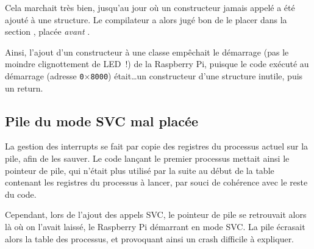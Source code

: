 \documentclass[11pt,a4paper]{article}
\newcommand{\hex}[1]{\texttt{0$\times$#1}}
\begin{document}
Cela marchait très bien, jusqu'au jour où un constructeur jamais appelé a été
ajouté à une structure. Le compilateur a alors jugé bon de le placer dans
la section , placée \emph{avant} .

Ainsi, l'ajout d'un constructeur à une classe empêchait le démarrage
(pas le moindre clignottement de LED~!) de la Raspberry Pi, puisque le code
exécuté au démarrage (adresse \hex{8000}) était\ldots un constructeur d'une
structure inutile, puis un return.

\subsection*{Pile du mode SVC mal placée}
La gestion des interrupts se fait par copie des registres du processus
actuel sur la pile, afin de les sauver. Le code lançant le premier
processus mettait ainsi le pointeur de pile, qui n'était plus utilisé
par la suite au début de la table contenant les registres du processus
à lancer, par souci de cohérence avec le reste du code.

Cependant, lors de l'ajout des appels SVC, le pointeur de pile se
retrouvait alors là où on l'avait laissé, le Raspberry Pi démarrant en
mode SVC\@. La pile écrasait alors la table des processus, et provoquant
ainsi un crash difficile à expliquer.
\end{document}
